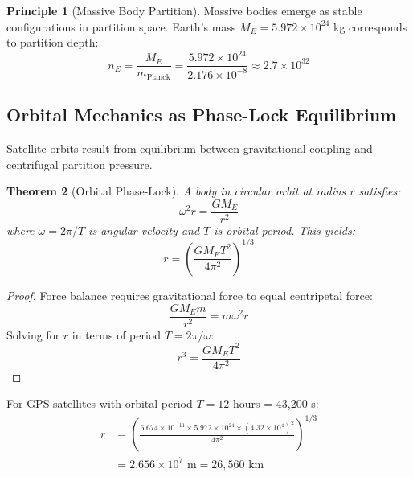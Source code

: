 \documentclass[twocolumn,10pt,a4paper]{article}
\newtheorem{theorem}{Theorem}[section]
\theoremstyle{definition}
\newtheorem{principle}[theorem]{Principle}
\theoremstyle{remark}
\begin{document}
\begin{principle}[Massive Body Partition]
\label{prin:massive}
Massive bodies emerge as stable configurations in partition space. Earth's mass $M_E = 5.972 \times 10^{24}$ kg corresponds to partition depth:
\begin{equation}
    n_E = \frac{M_E}{m_{\text{Planck}}} = \frac{5.972 \times 10^{24}}{2.176 \times 10^{-8}} \approx 2.7 \times 10^{32}
\end{equation}
\end{principle}

\subsection{Orbital Mechanics as Phase-Lock Equilibrium}

Satellite orbits result from equilibrium between gravitational coupling and centrifugal partition pressure.

\begin{theorem}[Orbital Phase-Lock]
\label{thm:orbital}
A body in circular orbit at radius $r$ satisfies:
\begin{equation}
    \omega^2 r = \frac{GM_E}{r^2}
\end{equation}
where $\omega = 2\pi/T$ is angular velocity and $T$ is orbital period. This yields:
\begin{equation}
    r = \left(\frac{GM_E T^2}{4\pi^2}\right)^{1/3}
\end{equation}
\end{theorem}

\begin{proof}
Force balance requires gravitational force to equal centripetal force:
\begin{equation}
    \frac{GM_E m}{r^2} = m\omega^2 r
\end{equation}
Solving for $r$ in terms of period $T = 2\pi/\omega$:
\begin{equation}
    r^3 = \frac{GM_E T^2}{4\pi^2}
\end{equation}
\end{proof}

For GPS satellites with orbital period $T = 12$ hours = 43,200 s:
\begin{align}
    r &= \left(\frac{6.674 \times 10^{-11} \times 5.972 \times 10^{24} \times (4.32 \times 10^4)^2}{4\pi^2}\right)^{1/3} \\
    &= 2.656 \times 10^7 \text{ m} = 26,560 \text{ km}
\end{align}
\end{document}
